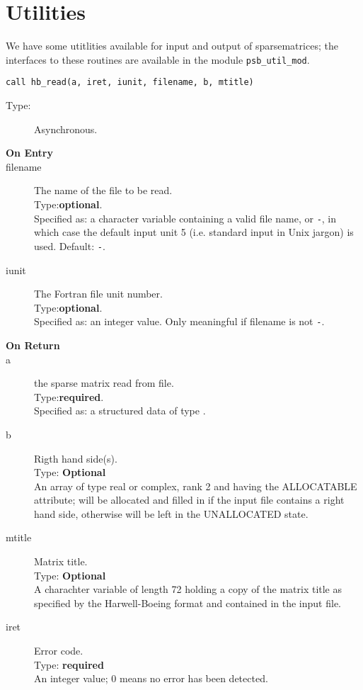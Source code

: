 \section{Utilities}
\label{sec:util}

We have some utitlities available for input and output of
sparsematrices; the interfaces to these routines are available in the
module \verb|psb_util_mod|.




\clearpage{}

\begin{lstlisting}
call hb_read(a, iret, iunit, filename, b, mtitle)
\end{lstlisting}

\begin{description}
\item[Type:] Asynchronous.
\item[\bf  On Entry ]
\item[filename] The name of the file to be read.\\
Type:{\bf optional}.\\
Specified as: a character variable containing a valid file name, or
\verb|-|, in which case the default input unit  5 (i.e. standard input
in Unix jargon) is used. Default: \verb|-|. 
\item[iunit] The Fortran file unit number.\\
Type:{\bf optional}.\\
Specified as: an integer value. Only meaningful if filename is not \verb|-|.
\end{description}

\begin{description}
\item[\bf On Return]
\item[a] the sparse matrix read from file.\\
Type:{\bf required}.\\
Specified as: a structured data of type \spdata.
\item[b] Rigth hand side(s).\\
Type: {\bf Optional} \\
An  array of type real or complex, rank 2 and having the ALLOCATABLE
attribute; will be allocated and filled in if the input file contains
a right hand side, otherwise will be left in the UNALLOCATED state. 
\item[mtitle] Matrix title.\\
Type: {\bf Optional} \\
A charachter variable of length 72 holding a copy of the
matrix title as specified by the Harwell-Boeing format and contained
in the input file.
\item[iret] Error code.\\
Type: {\bf required} \\
An integer value; 0 means no error has been detected. 
\end{description}



